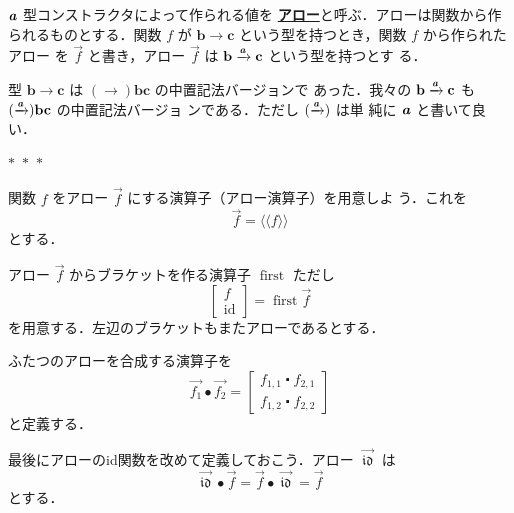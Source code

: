 \documentclass[a5paper,twoside,fleqn,draft]{jsbook}
\def\llangle{\langle\!\langle}
\def\rrangle{\rangle\!\rangle}
\newcommand{\Langle}{\llangle}
\newcommand{\Rangle}{\rrangle}
\newcommand{\separator}{\begin{center}$*$~$*$~$*$\end{center}}
\newcommand{\keyword}[1]{{\underline{\textbf{#1}}}}
\newcommand{\mSpecialFunc}[1]{\mathrm{#1}}
\newcommand{\mVarSpecialFunc}[1]{\mathfrak{#1}}
\DeclareMathOperator{\mFirst}{\mSpecialFunc{first}}
\DeclareMathOperator{\mId}{\mSpecialFunc{id}}
\DeclareMathOperator{\mIdCat}{\mVarSpecialFunc{id}}
\newcommand{\mArrowArrow}[1]{\xrightarrow{#1}}
\DeclareMathOperator{\mCompFunc}{\centerdot}
\DeclareMathOperator{\mCompCat}{\bullet}
\DeclareMathOperator{\mFuncArrow}{\rightarrow}
\newcommand{\mType}[1]{\mathbf{#1}} %
\newcommand{\mPolymorphicTypeParameter}[1]{\textbf{\textit{#1}}}
\newcommand{\mB}{\mType{b}}
\newcommand{\mC}{\mType{c}}
\newcommand{\mArrowWith}[1]{\Langle#1\Rangle}
\newcommand{\mArrow}[1]{\Vec{#1}}
\begin{document}
$\mPolymorphicTypeParameter{a}$ 型コンストラクタによって作られる値を
\keyword{アロー}と呼ぶ．アローは関数から作られるものとする．関数 $f$
が $\mB\mFuncArrow\mC$ という型を持つとき，関数 $f$ から作られたアロー
を $\mArrow{f}$ と書き，アロー $\mArrow{f}$ は
$\mB\mArrowArrow{\mPolymorphicTypeParameter{a}}\mC$ という型を持つとす
る．

型 $\mB\mFuncArrow\mC$ は $(\mFuncArrow)\mB\mC$ の中置記法バージョンで
あった．我々の $\mB\mArrowArrow{\mPolymorphicTypeParameter{a}}\mC$ も
$(\mArrowArrow{\mPolymorphicTypeParameter{a}})\mB\mC$ の中置記法バージョ
ンである．ただし $(\mArrowArrow{\mPolymorphicTypeParameter{a}})$ は単
純に $\mPolymorphicTypeParameter{a}$ と書いて良い．

\separator

関数 $f$ をアロー $\mArrow{f}$ にする演算子（アロー演算子）を用意しよ
う．これを
\begin{equation}
  \mArrow{f}
  =\mArrowWith{f}
\end{equation}
とする．

アロー $\mArrow{f}$ からブラケットを作る演算子 $\mFirst$ ただし
\begin{equation}
  \begin{bmatrix}
    f\\
    \mId
  \end{bmatrix}
  =
  \mFirst\mArrow{f}
\end{equation}
を用意する．左辺のブラケットもまたアローであるとする．

ふたつのアローを合成する演算子を
\begin{equation}
  \mArrow{f_1}\mCompCat\mArrow{f_2}
  =
  \begin{bmatrix}
    f_{1,1}\mCompFunc f_{2,1}\\
    f_{1,2}\mCompFunc f_{2,2}
  \end{bmatrix}
\end{equation}
と定義する．

最後にアローのid関数を改めて定義しておこう．アロー $\mArrow{\mIdCat}$
は
\begin{equation}
  \mArrow{\mIdCat}\mCompCat\mArrow{f}
  =\mArrow{f}\mCompCat\mArrow{\mIdCat}
  =\mArrow{f}
\end{equation}
とする．
\end{document}
